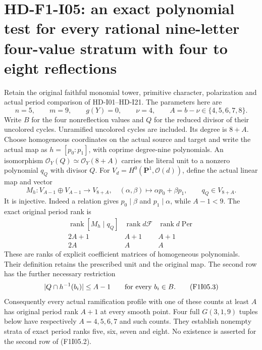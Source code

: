 \section[HD-F1-I05: exact unit dichotomy and four more rational strata]{HD-F1-I05: an exact polynomial test for every rational nine-letter four-value stratum with four to eight reflections}
\label{sec:f1-nine-letter-unit-dichotomy}

Retain the original faithful monomial tower, primitive character,
polarization and actual period comparison of HD-I01--HD-I21.
The parameters here are
\[
 n=5,\qquad m=9,\qquad g(Y)=0,\qquad \nu=4,
 \qquad A=b-\nu\in\{4,5,6,7,8\}.
\]
Write $B$ for the four nonreflection values and $Q$ for
the reduced divisor of their uncolored cycles. Unramified
uncolored cycles are included. Its degree is $8+A$.
Choose homogeneous coordinates on the actual source and
target and write the actual map as $h=[p_0:p_1]$, with
coprime degree-nine polynomials. An isomorphism
$\mathcal O_Y(Q)\simeq\mathcal O_Y(8+A)$ carries the
literal unit to a nonzero polynomial $q_Q$ with divisor $Q$.
For $V_d=H^0(\mathbf P^1,\mathcal O(d))$, define the actual
linear map and vector
\[
 M_h:V_{A-1}\oplus V_{A-1}\longrightarrow V_{8+A},
       \quad(\alpha,\beta)\longmapsto\alpha p_0+\beta p_1,
       \qquad q_Q\in V_{8+A}.
 \tag{F1I05.1}
\]
It is injective. Indeed a relation gives $p_0\mid\beta$
and $p_1\mid\alpha$, while $A-1<9$.
The exact original period rank is
\[
\begin{array}{c|c|c}
 \operatorname{rank}[M_h\mid q_Q]&
       \operatorname{rank}d\mathcal F&\operatorname{rank}d\operatorname{Per}\\ \hline
 2A+1&A+1&A+1\\
 2A&A&A
\end{array}
 \tag{F1I05.2}
\]
These are ranks of explicit coefficient matrices of homogeneous
polynomials. Their definition retains the prescribed unit and the
original map. The second row has the further necessary restriction
\[
             |Q\cap h^{-1}(b_i)|\le A-1
                       \qquad\hbox{for every }b_i\in B.
 \tag{F1I05.3}
\]
Consequently every actual ramification profile with one of these
counts at least $A$ has original period rank $A+1$ at every
smooth point. Four full $G(3,1,9)$ tuples below have respectively
$A=4,5,6,7$ and such counts. They establish nonempty strata of
exact period ranks five, six, seven and eight. No existence is
asserted for the second row of (F1I05.2).

